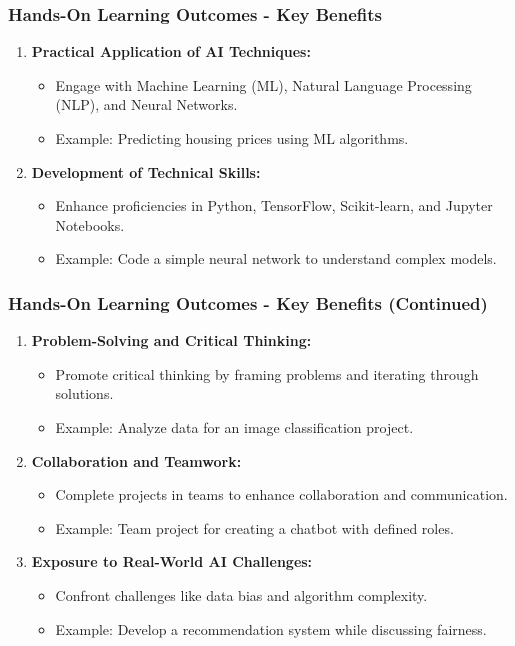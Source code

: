 \documentclass[aspectratio=169]{beamer}
\begin{document}
\begin{frame}[fragile]
    \frametitle{Hands-On Learning Outcomes - Key Benefits}
    \begin{enumerate}
        \item \textbf{Practical Application of AI Techniques:}
            \begin{itemize}
                \item Engage with Machine Learning (ML), Natural Language Processing (NLP), and Neural Networks.
                \item Example: Predicting housing prices using ML algorithms.
            \end{itemize}
        \item \textbf{Development of Technical Skills:}
            \begin{itemize}
                \item Enhance proficiencies in Python, TensorFlow, Scikit-learn, and Jupyter Notebooks.
                \item Example: Code a simple neural network to understand complex models.
            \end{itemize}
    \end{enumerate}
\end{frame}

\begin{frame}[fragile]
    \frametitle{Hands-On Learning Outcomes - Key Benefits (Continued)}
    \begin{enumerate}[resume]
        \item \textbf{Problem-Solving and Critical Thinking:}
            \begin{itemize}
                \item Promote critical thinking by framing problems and iterating through solutions.
                \item Example: Analyze data for an image classification project.
            \end{itemize}
        \item \textbf{Collaboration and Teamwork:}
            \begin{itemize}
                \item Complete projects in teams to enhance collaboration and communication.
                \item Example: Team project for creating a chatbot with defined roles.
            \end{itemize}
        \item \textbf{Exposure to Real-World AI Challenges:}
            \begin{itemize}
                \item Confront challenges like data bias and algorithm complexity.
                \item Example: Develop a recommendation system while discussing fairness.
            \end{itemize}
    \end{enumerate}
\end{frame}
\end{document}
